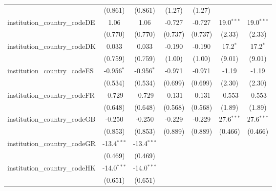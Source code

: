 \begin{tabular}{lcccccc}
                                         & (0.861)       & (0.861)       & (1.27)        & (1.27)        &               &   \\   
   institution\_country\_codeDE          & 1.06          & 1.06          & -0.727        & -0.727        & 19.0$^{***}$  & 19.0$^{***}$\\   
                                         & (0.770)       & (0.770)       & (0.737)       & (0.737)       & (2.33)        & (2.33)\\   
   institution\_country\_codeDK          & 0.033         & 0.033         & -0.190        & -0.190        & 17.2$^{*}$    & 17.2$^{*}$\\   
                                         & (0.759)       & (0.759)       & (1.00)        & (1.00)        & (9.01)        & (9.01)\\   
   institution\_country\_codeES          & -0.956$^{*}$  & -0.956$^{*}$  & -0.971        & -0.971        & -1.19         & -1.19\\   
                                         & (0.534)       & (0.534)       & (0.699)       & (0.699)       & (2.30)        & (2.30)\\   
   institution\_country\_codeFR          & -0.729        & -0.729        & -0.131        & -0.131        & -0.553        & -0.553\\   
                                         & (0.648)       & (0.648)       & (0.568)       & (0.568)       & (1.89)        & (1.89)\\   
   institution\_country\_codeGB          & -0.250        & -0.250        & -0.229        & -0.229        & 27.6$^{***}$  & 27.6$^{***}$\\   
                                         & (0.853)       & (0.853)       & (0.889)       & (0.889)       & (0.466)       & (0.466)\\   
   institution\_country\_codeGR          & -13.4$^{***}$ & -13.4$^{***}$ &               &               &               &   \\   
                                         & (0.469)       & (0.469)       &               &               &               &   \\   
   institution\_country\_codeHK          & -14.0$^{***}$ & -14.0$^{***}$ &               &               &               &   \\   
                                         & (0.651)       & (0.651)       &               &               &               &   \\   

\end{tabular}

